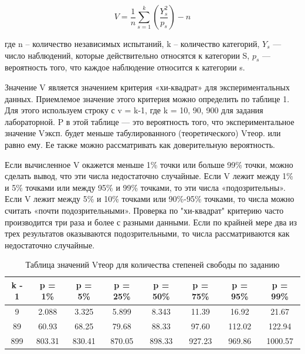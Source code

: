 \documentclass[14pt, a4paper]{extarticle}
\begin{document}
\begin{equation}
	V = \frac{1}{n} \sum_{s = 1}^k (\frac{Y_{s}^2}{p_{s}}) - n
\end{equation}

где n – количество независимых испытаний, k – количество категорий, $Y_{s}$ — число наблюдений, которые действительно относятся к категории S, $p_{s}$ — вероятность того, что каждое наблюдение относится к категории s.  

Значение V является значением критерия «хи-квадрат» для экспериментальных данных. Приемлемое значение этого критерия можно определить по таблице 1. Для этого используем строку с v = k-1, где k = 10, 90, 900 для задания лабораторной.  P в этой таблице — это вероятность того, что экспериментальное значение Vэксп. будет меньше табулированного (теоретического) Vтеор. или равно ему. Ее также можно рассматривать как доверительную вероятность.

Если вычисленное V окажется меньше 1\% точки или больше 99\% точки, можно сделать вывод, что эти числа недостаточно случайные. Если V лежит между 1\% и 5\% точками или между 95\% и 99\% точками, то эти числа «подозрительны». Если V лежит между 5\% и 10\% точками или 90\%-95\% точками, то числа можно считать «почти подозрительными». Проверка по "хи-квадрат" критерию часто производится три раза и более с разными данными. Если по крайней мере два из трех результатов оказываются подозрительными, то числа рассматриваются как недостаточно случайные.


\begin{table}[H]
	\centering
	\begin{tabular}{ | c | c | c | c | c | c | c | c |}
		\hline
		k - 1 & p = 1\% & p = 5\% & p = 25\% & p = 50\% & p = 75\% & p = 95\% & p = 99\% \\ \hline
		9 & 2.088 & 3.325 & 5.899 & 8.343 & 11.39 & 16.92 & 21.67 \\ \hline
		89 & 60.93 & 68.25 & 79.68 & 88.33 & 97.60 & 112.02 & 122.94 \\ \hline
		899 & 803.31 & 830.41 & 870.05 & 898.33 & 927.23 & 969.86 & 1000.57 \\ \hline
	\end{tabular}
	\caption{Таблица значений Vтеор для количества степеней свободы по заданию}
\end{table}
\end{document}
